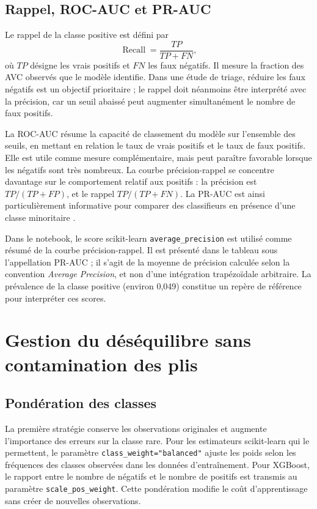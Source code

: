 \subsection{Rappel, ROC-AUC et PR-AUC}
Le rappel de la classe positive est défini par
\[
\operatorname{Recall} = \frac{TP}{TP+FN},
\]
où \(TP\) désigne les vrais positifs et \(FN\) les faux négatifs. Il mesure la fraction des AVC observés que le modèle identifie. Dans une étude de triage, réduire les faux négatifs est un objectif prioritaire ; le rappel doit néanmoins être interprété avec la précision, car un seuil abaissé peut augmenter simultanément le nombre de faux positifs.

La ROC-AUC résume la capacité de classement du modèle sur l'ensemble des seuils, en mettant en relation le taux de vrais positifs et le taux de faux positifs. Elle est utile comme mesure complémentaire, mais peut paraître favorable lorsque les négatifs sont très nombreux. La courbe précision-rappel se concentre davantage sur le comportement relatif aux positifs : la précision est \(TP/(TP+FP)\), et le rappel \(TP/(TP+FN)\). La PR-AUC est ainsi particulièrement informative pour comparer des classifieurs en présence d'une classe minoritaire \cite{saito2015precisionrecall}.

Dans le notebook, le score scikit-learn \texttt{average\_precision} est utilisé comme résumé de la courbe précision-rappel. Il est présenté dans le tableau sous l'appellation PR-AUC ; il s'agit de la moyenne de précision calculée selon la convention \textit{Average Precision}, et non d'une intégration trapézoïdale arbitraire. La prévalence de la classe positive (environ 0,049) constitue un repère de référence pour interpréter ces scores.

\section{Gestion du déséquilibre sans contamination des plis}
\subsection{Pondération des classes}
La première stratégie conserve les observations originales et augmente l'importance des erreurs sur la classe rare. Pour les estimateurs scikit-learn qui le permettent, le paramètre \texttt{class\_weight="balanced"} ajuste les poids selon les fréquences des classes observées dans les données d'entraînement. Pour XGBoost, le rapport entre le nombre de négatifs et le nombre de positifs est transmis au paramètre \texttt{scale\_pos\_weight}. Cette pondération modifie le coût d'apprentissage sans créer de nouvelles observations.

